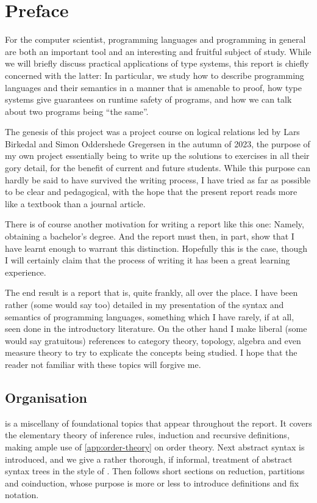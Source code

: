 \chapter{Preface}

For the computer scientist, programming languages and programming in general are both an important tool and an interesting and fruitful subject of study. While we will briefly discuss practical applications of type systems, this report is chiefly concerned with the latter: In particular, we study how to describe programming languages and their semantics in a manner that is amenable to proof, how type systems give guarantees on runtime safety of programs, and how we can talk about two programs being \enquote{the same}.

The genesis of this project was a project course on logical relations led by Lars Birkedal and Simon Oddershede Gregersen in the autumn of 2023, the purpose of my own project essentially being to write up the solutions to exercises in all their gory detail, for the benefit of current and future students. While this purpose can hardly be said to have survived the writing process, I have tried as far as possible to be clear and pedagogical, with the hope that the present report reads more like a textbook than a journal article.

There is of course another motivation for writing a report like this one: Namely, obtaining a bachelor's degree. And the report must then, in part, show that I have learnt enough to warrant this distinction. Hopefully this is the case, though I will certainly claim that the process of writing it has been a great learning experience.

The end result is a report that is, quite frankly, all over the place. I have been rather (some would say too) detailed in my presentation of the syntax and semantics of programming languages, something which I have rarely, if at all, seen done in the introductory literature. On the other hand I make liberal (some would say gratuitous) references to category theory, topology, algebra and even measure theory to try to explicate the concepts being studied. I hope that the reader not familiar with these topics will forgive me.


\section*{Organisation}

 is a miscellany of foundational topics that appear throughout the report. It covers the elementary theory of inference rules, induction and recursive definitions, making ample use of \cref{app:order-theory} on order theory. Next abstract syntax is introduced, and we give a rather thorough, if informal, treatment of abstract syntax trees in the style of \textcite{harper-pl}. Then follows short sections on reduction, partitions and coinduction, whose purpose is more or less to introduce definitions and fix notation.

